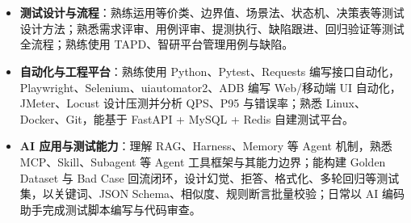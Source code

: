 \documentclass[10pt]{article}
\begin{document}
    \ResumeContactBar
    \ResumeProfileAndEducation


    \section[专业技能]{}
    \begin{itemize}
        \item \textbf{测试设计与流程}：熟练运用等价类、边界值、场景法、状态机、决策表等测试设计方法；熟悉需求评审、用例评审、提测执行、缺陷跟进、回归验证等测试全流程；熟练使用 TAPD、智研平台管理用例与缺陷。
        \item \textbf{自动化与工程平台}：熟练使用 Python、Pytest、Requests 编写接口自动化，Playwright、Selenium、uiautomator2、ADB 编写 Web/移动端 UI 自动化，JMeter、Locust 设计压测并分析 QPS、P95 与错误率；熟悉 Linux、Docker、Git，能基于 FastAPI + MySQL + Redis 自建测试平台。
        \item \textbf{AI 应用与测试能力}：理解 RAG、Harness、Memory 等 Agent 机制，熟悉 MCP、Skill、Subagent 等 Agent 工具框架与其能力边界；能构建 Golden Dataset 与 Bad Case 回流闭环，设计幻觉、拒答、格式化、多轮回归等测试集，以关键词、JSON Schema、相似度、规则断言批量校验；日常以 AI 编码助手完成测试脚本编写与代码审查。
    \end{itemize}


    \section[实习经历]{}
\end{document}
